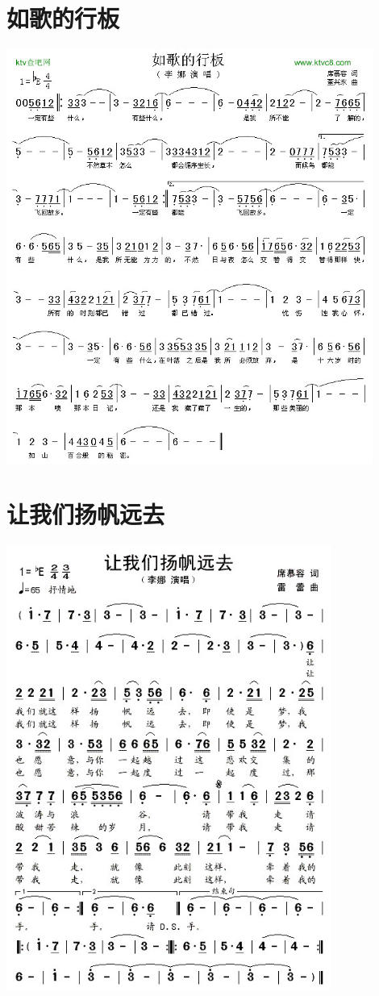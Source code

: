 \documentclass[cn,pad,twocol]{elegantbook}
\begin{document}
\section{如歌的行板}\includegraphics[width=0.9\textwidth]{rpi400/20210209如歌的行板.jpg}
\section{让我们扬帆远去}\includegraphics[width=0.8\textwidth]{rpi400/20210209让我们扬帆远去.jpg}
\end{document}
